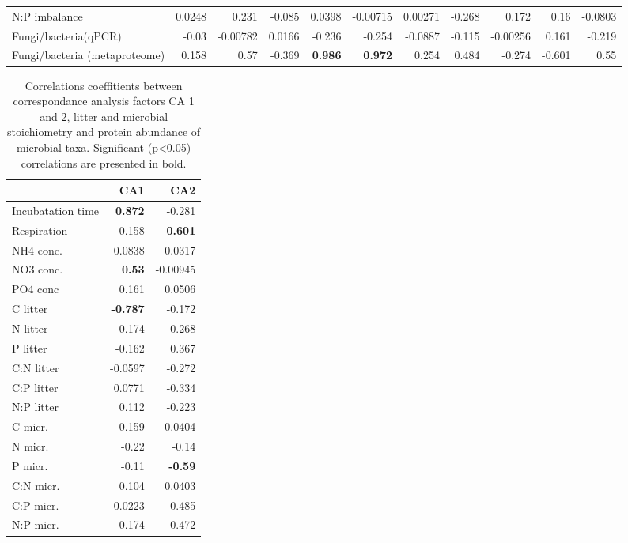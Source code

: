 \documentclass[10pt]{article}
\begin{document}
\begin{flushleft}
\begin{landscape}
\begin{table}[h!]
\begin{center}
{\begin{tabular}{lrrrrrrrrrr}
  N:P imbalance & 0.0248 & 0.231 & -0.085 & 0.0398 & -0.00715 & 0.00271 & -0.268 & 0.172 & 0.16 & -0.0803 \\ 
  Fungi/bacteria(qPCR) & -0.03 & -0.00782 & 0.0166 & -0.236 & -0.254 & -0.0887 & -0.115 & -0.00256 & 0.161 & -0.219 \\ 
  Fungi/bacteria (metaproteome) & 0.158 & 0.57 & -0.369 & \textbf{ 0.986 } & \textbf{ 0.972 } & 0.254 & 0.484 & -0.274 & -0.601 & 0.55 \\ 
   \hline
\end{tabular}
}
\end{center}
\end{table}\end{landscape}

\begin{table}[h!]
\begin{center}
\caption{Correlations coeffitients between correspondance analysis factors CA 1 and 2, litter and microbial stoichiometry and protein abundance of microbial taxa. Significant (p\textless 0.05) correlations are presented in bold.}
\label{catab}
{\small
\begin{tabular}{lrr}
  \hline
 & CA1 & CA2 \\ 
  \hline
Incubatation time & \textbf{ 0.872 } & -0.281 \\ 
  Respiration & -0.158 & \textbf{ 0.601 } \\ 
  NH4 conc. & 0.0838 & 0.0317 \\ 
  NO3 conc. & \textbf{ 0.53 } & -0.00945 \\ 
  PO4 conc & 0.161 & 0.0506 \\ 
  C litter & \textbf{ -0.787 } & -0.172 \\ 
  N litter & -0.174 & 0.268 \\ 
  P litter & -0.162 & 0.367 \\ 
  C:N litter & -0.0597 & -0.272 \\ 
  C:P litter & 0.0771 & -0.334 \\ 
  N:P litter & 0.112 & -0.223 \\ 
  C micr. & -0.159 & -0.0404 \\ 
  N micr. & -0.22 & -0.14 \\ 
  P micr. & -0.11 & \textbf{ -0.59 } \\ 
  C:N micr. & 0.104 & 0.0403 \\ 
  C:P micr. & -0.0223 & 0.485 \\ 
  N:P micr. & -0.174 & 0.472 \\ 

\end{tabular}}
\end{center}
\end{table}
\end{flushleft}
\end{document}
